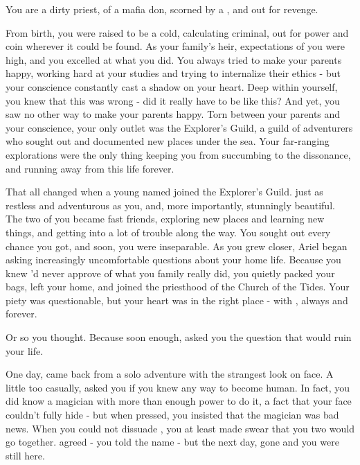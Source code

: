 \documentclass[char]{NeptuneBall}
\begin{document}
\name{\cPriest{}}


You are a dirty priest, \cPriest{\offspring} of a mafia don, scorned by a \cAriel{\Prince}, and out for revenge.

From birth, you were raised to be a cold, calculating criminal, out for power and coin wherever it could be found. As your family's heir, expectations of you were high, and you excelled at what you did. You always tried to make your parents happy, working hard at your studies and trying to internalize their ethics - but your conscience constantly cast a shadow on your heart. Deep within yourself, you knew that this was wrong - did it really have to be like this? And yet, you saw no other way to make your parents happy. Torn between your parents and your conscience, your only outlet was the Explorer's Guild, a guild of adventurers who sought out and documented new places under the sea. Your far-ranging explorations were the only thing keeping you from succumbing to the dissonance, and running away from this life forever.

That all changed when a young \cAriel{\prince} named \cAriel{} joined the Explorer's Guild. \cAriel{\They} \cAriel{\were} just as restless and adventurous as you, and, more importantly, stunningly beautiful. The two of you became fast friends, exploring new places and learning new things, and getting into a lot of trouble along the way. You sought \cAriel{\them} out every chance you got, and soon, you were inseparable. As you grew closer, Ariel began asking increasingly uncomfortable questions about your home life. Because you knew \cAriel{\they}'d never approve of what you family really did, you quietly packed your bags, left your home, and joined the priesthood of the Church of the Tides. Your piety was questionable, but your heart was in the right place - with \cAriel{}, always and forever.

Or so you thought. Because soon enough, \cAriel{} asked you the question that would ruin your life. 

One day, \cAriel{} came back from a solo adventure with the strangest look on \cAriel{\their} face. A little too casually, \cAriel{\they} asked you if you knew any way to become human. In fact, you did know a magician with more than enough power to do it, a fact that your face couldn't fully hide - but when \cAriel{\they} pressed, you insisted that the magician was bad news. When you could not dissuade \cAriel{\them}, you at least made \cAriel{\them} swear that you two would go together. \cAriel{\They} agreed - you told \cAriel{\them} the name \cWitch{} - but the next day, \cAriel{\they} \cAriel{\were} gone and you were still here.
\end{document}
